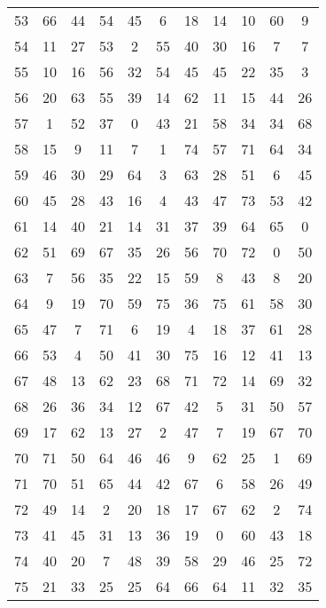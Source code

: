 \begin{table}
\begin{tabular}{c c c c c c c c c c c }
53 & 66 & 44 & 54 & 45 & 6 & 18 & 14 & 10 & 60 & 9 \\
54 & 11 & 27 & 53 & 2 & 55 & 40 & 30 & 16 & 7 & 7 \\
55 & 10 & 16 & 56 & 32 & 54 & 45 & 45 & 22 & 35 & 3 \\
56 & 20 & 63 & 55 & 39 & 14 & 62 & 11 & 15 & 44 & 26 \\
57 & 1 & 52 & 37 & 0 & 43 & 21 & 58 & 34 & 34 & 68 \\
58 & 15 & 9 & 11 & 7 & 1 & 74 & 57 & 71 & 64 & 34 \\
59 & 46 & 30 & 29 & 64 & 3 & 63 & 28 & 51 & 6 & 45 \\
60 & 45 & 28 & 43 & 16 & 4 & 43 & 47 & 73 & 53 & 42 \\
61 & 14 & 40 & 21 & 14 & 31 & 37 & 39 & 64 & 65 & 0 \\
62 & 51 & 69 & 67 & 35 & 26 & 56 & 70 & 72 & 0 & 50 \\
63 & 7 & 56 & 35 & 22 & 15 & 59 & 8 & 43 & 8 & 20 \\
64 & 9 & 19 & 70 & 59 & 75 & 36 & 75 & 61 & 58 & 30 \\
65 & 47 & 7 & 71 & 6 & 19 & 4 & 18 & 37 & 61 & 28 \\
66 & 53 & 4 & 50 & 41 & 30 & 75 & 16 & 12 & 41 & 13 \\
67 & 48 & 13 & 62 & 23 & 68 & 71 & 72 & 14 & 69 & 32 \\
68 & 26 & 36 & 34 & 12 & 67 & 42 & 5 & 31 & 50 & 57 \\
69 & 17 & 62 & 13 & 27 & 2 & 47 & 7 & 19 & 67 & 70 \\
70 & 71 & 50 & 64 & 46 & 46 & 9 & 62 & 25 & 1 & 69 \\
71 & 70 & 51 & 65 & 44 & 42 & 67 & 6 & 58 & 26 & 49 \\
72 & 49 & 14 & 2 & 20 & 18 & 17 & 67 & 62 & 2 & 74 \\
73 & 41 & 45 & 31 & 13 & 36 & 19 & 0 & 60 & 43 & 18 \\
74 & 40 & 20 & 7 & 48 & 39 & 58 & 29 & 46 & 25 & 72 \\
75 & 21 & 33 & 25 & 25 & 64 & 66 & 64 & 11 & 32 & 35 \\
\hline
\end{tabular}
\end{table}